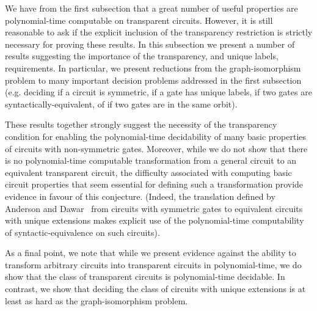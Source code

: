 \documentclass[../paper.tex]{subfiles}
\begin{document}
We have from the first subsection that a great number of useful properties are
polynomial-time computable on transparent circuits. However, it is still
reasonable to ask if the explicit inclusion of the transparency restriction is
strictly necessary for proving these results. In this subsection we present a
number of results suggesting the importance of the transparency, and unique
labels, requirements. In particular, we present reductions from the
graph-isomorphism problem to many important decision problems addressed in the
first subsection (e.g. deciding if a circuit is symmetric, if a gate has unique
labels, if two gates are syntactically-equivalent, of if two gates are in the
same orbit).

These results together strongly suggest the necessity of the transparency
condition for enabling the polynomial-time decidability of many basic properties
of circuits with non-symmetric gates. Moreover, while we do not show that there
is no polynomial-time computable transformation from a general circuit to an
equivalent transparent circuit, the difficulty associated with computing basic
circuit properties that seem essential for defining such a transformation
provide evidence in favour of this conjecture. (Indeed, the translation defined
by Anderson and Dawar~\cite{AndersonD17} from circuits with symmetric gates to
equivalent circuits with unique extensions makes explicit use of the
polynomial-time computability of syntactic-equivalence on such circuits).

As a final point, we note that while we present evidence against the ability to
transform arbitrary circuits into transparent circuits in polynomial-time, we do
show that the class of transparent circuits is polynomial-time decidable. In
contrast, we show that deciding the class of circuits with unique extensions is
at least as hard as the graph-isomorphism problem.



\end{document}
